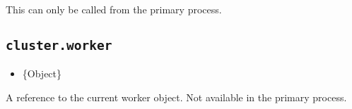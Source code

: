 This can only be called from the primary process.

\subsection{\texorpdfstring{\texttt{cluster.worker}}{cluster.worker}}\label{cluster.worker}

\begin{itemize}
\tightlist
\item
  \{Object\}
\end{itemize}

A reference to the current worker object. Not available in the primary
process.

\begin{Shaded}
\begin{Highlighting}[]
 \OperatorTok{;}

\NormalTok{) \{}
  \NormalTok{(}\NormalTok{)}\OperatorTok{;}
\NormalTok{()}\OperatorTok{;}
\NormalTok{()}\OperatorTok{;}
\NormalTok{\} } \NormalTok{) \{}
  \NormalTok{(}\SpecialCharTok{$\{}\SpecialCharTok{\}}\VerbatimStringTok{\textasciigrave{}}\NormalTok{)}\OperatorTok{;}
\NormalTok{\}}
\end{Highlighting}
\end{Shaded}

